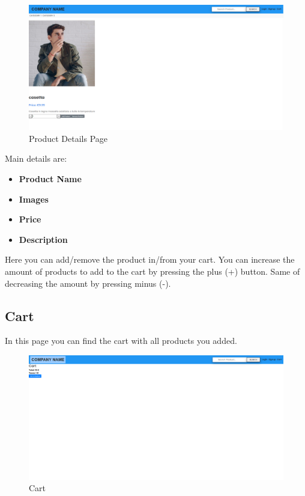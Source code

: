 \begin{figure}[H]
    \centering
    \includegraphics[width=\linewidth]{res/images/cliente/pdp.png}
    \caption{Product Details Page}
\end{figure}

Main details are:

\begin{itemize} 
    \item \textbf{Product Name}
    \item \textbf{Images}
    \item \textbf{Price} 
    \item \textbf{Description} 
\end{itemize}

Here you can add/remove the product in/from your cart. You can increase the amount of products to add to the cart by pressing the plus (+) button. Same of decreasing the amount by pressing minus (-).

\subsection{Cart}
In this page you can find the cart with all products you added.

\begin{figure}[H]
    \centering
    \includegraphics[width=\linewidth]{res/images/cliente/cart.png}
    \caption{Cart}
\end{figure}
